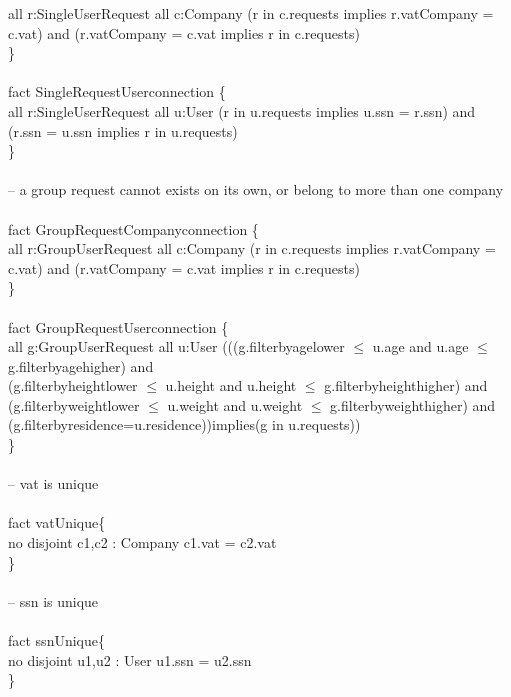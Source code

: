 \documentclass{article}
\begin{document}
all r:SingleUserRequest \textbar \space all c:Company \textbar \space (r in c.requests implies r.vatCompany = c.vat) and (r.vatCompany = c.vat implies r in c.requests)\\
\}\\
\\
fact SingleRequestUserconnection \{\\
all r:SingleUserRequest \textbar \space all u:User \textbar \space (r in u.requests implies u.ssn = r.ssn) and (r.ssn = u.ssn implies r in u.requests)\\
\}\\
\\
-- a group request cannot exists on its own, or belong to more than one company\\
\\
fact GroupRequestCompanyconnection \{\\
all r:GroupUserRequest \textbar \space all c:Company \textbar \space (r in c.requests implies r.vatCompany = c.vat) and (r.vatCompany = c.vat implies r in c.requests)\\
\}\\
\\
fact GroupRequestUserconnection \{\\
all g:GroupUserRequest \textbar \space all u:User \textbar \space (((g.filterbyagelower $\leq$ u.age and u.age $\leq$ g.filterbyagehigher) and\\ (g.filterbyheightlower $\leq$ u.height and u.height $\leq$ g.filterbyheighthigher) and\\ (g.filterbyweightlower $\leq$ u.weight and u.weight $\leq$ g.filterbyweighthigher) and\\ (g.filterbyresidence=u.residence))implies(g in u.requests))\\
\}\\
\\
-- vat is unique\\
\\
fact vatUnique\{\\
no disjoint c1,c2 : Company \textbar \space c1.vat = c2.vat\\
\}\\
\\
-- ssn is unique\\
\\
fact ssnUnique\{\\
no disjoint u1,u2 : User \textbar \space u1.ssn = u2.ssn\\
\}\\
\\
\end{document}
